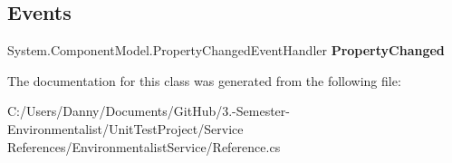 \subsection*{Events}
\begin{DoxyCompactItemize}
\item 
\hypertarget{class_unit_test_project_1_1_environmentalist_service_1_1_measurement_ac2e517061e9fcd2018d13606f104deea}{}System.\+Component\+Model.\+Property\+Changed\+Event\+Handler {\bfseries Property\+Changed}\label{class_unit_test_project_1_1_environmentalist_service_1_1_measurement_ac2e517061e9fcd2018d13606f104deea}

\end{DoxyCompactItemize}


The documentation for this class was generated from the following file\+:\begin{DoxyCompactItemize}
\item 
C\+:/\+Users/\+Danny/\+Documents/\+Git\+Hub/3.-\/\+Semester-\/\+Environmentalist/\+Unit\+Test\+Project/\+Service References/\+Environmentalist\+Service/Reference.\+cs\end{DoxyCompactItemize}
